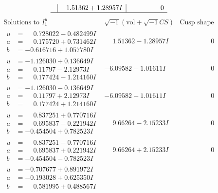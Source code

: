 \documentclass[1p]{elsarticle_modified}
\theoremstyle{definition}
\newcommand{\I}{\sqrt{-1}}
\begin{document}
$$\begin{array}{c|c|c}
 & \phantom{-}1.51362 + 1.28957 I & \phantom{-0.000000 } 0\\
 \hline 
 \end{array}$$\newpage$$\begin{array}{c|c|c}  
\text{Solutions to }I^u_{1}& \I (\text{vol} + \sqrt{-1}CS) & \text{Cusp shape}\\
 \hline 
\begin{aligned}
u &= \phantom{-}0.728022 - 0.482499 I \\
a &= \phantom{-}0.175720 + 0.731462 I \\
b &= -0.616716 + 1.057780 I\end{aligned}
 & \phantom{-}1.51362 - 1.28957 I & \phantom{-0.000000 } 0 \\ \hline\begin{aligned}
u &= -1.126030 + 0.136649 I \\
a &= \phantom{-}0.11797 - 2.12973 I \\
b &= \phantom{-}0.177424 - 1.214160 I\end{aligned}
 & -6.09582 - 1.01611 I & \phantom{-0.000000 } 0 \\ \hline\begin{aligned}
u &= -1.126030 - 0.136649 I \\
a &= \phantom{-}0.11797 + 2.12973 I \\
b &= \phantom{-}0.177424 + 1.214160 I\end{aligned}
 & -6.09582 + 1.01611 I & \phantom{-0.000000 } 0 \\ \hline\begin{aligned}
u &= \phantom{-}0.837251 + 0.770716 I \\
a &= \phantom{-}0.695837 - 0.221942 I \\
b &= -0.454504 + 0.782523 I\end{aligned}
 & \phantom{-}9.66264 - 2.15233 I & \phantom{-0.000000 } 0 \\ \hline\begin{aligned}
u &= \phantom{-}0.837251 - 0.770716 I \\
a &= \phantom{-}0.695837 + 0.221942 I \\
b &= -0.454504 - 0.782523 I\end{aligned}
 & \phantom{-}9.66264 + 2.15233 I & \phantom{-0.000000 } 0 \\ \hline\begin{aligned}
u &= -0.707677 + 0.891972 I \\
a &= -0.193028 + 0.625350 I \\
b &= \phantom{-}0.581995 + 0.488567 I\end{aligned}

\end{array}$$
\end{document}
